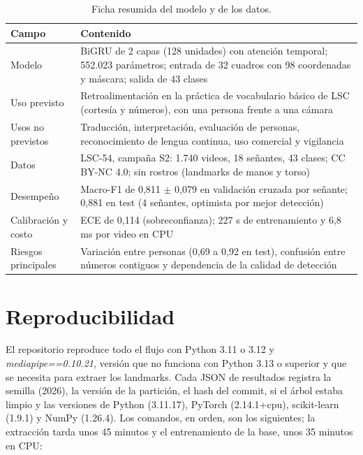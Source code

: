 \documentclass[11pt,a4paper]{article}
\newcommand{\code}[1]{\textit{#1}}
\begin{document}
\begin{table}[htbp]
\centering
\caption{Ficha resumida del modelo y de los datos.}\label{tab:ficha}
\small
\renewcommand{\arraystretch}{1.15}
\begin{tabularx}{\textwidth}{@{}>{\raggedright\arraybackslash}p{2.8cm}Y@{}}
\toprule
\textbf{Campo} & \textbf{Contenido}\\
\midrule
Modelo & BiGRU de 2 capas (128 unidades) con atención temporal; 552.023 parámetros; entrada de 32 cuadros con 98 coordenadas y máscara; salida de 43 clases\\
Uso previsto & Retroalimentación en la práctica de vocabulario básico de LSC (cortesía y números), con una persona frente a una cámara\\
Usos no previstos & Traducción, interpretación, evaluación de personas, reconocimiento de lengua continua, uso comercial y vigilancia\\
Datos & LSC-54, campaña S2: 1.740 videos, 18 señantes, 43 clases; CC BY-NC 4.0; sin rostros (landmarks de manos y torso)\\
Desempeño & Macro-F1 de 0,811 $\pm$ 0,079 en validación cruzada por señante; 0,881 en test (4 señantes, optimista por mejor detección)\\
Calibración y costo & ECE de 0,114 (sobreconfianza); 227 s de entrenamiento y 6,8 ms por video en CPU\\
Riesgos principales & Variación entre personas (0,69 a 0,92 en test), confusión entre números contiguos y dependencia de la calidad de detección\\
\bottomrule
\end{tabularx}
\end{table}

\section{Reproducibilidad}

El repositorio reproduce todo el flujo con Python 3.11 o 3.12 y \code{mediapipe==0.10.21}, versión que no funciona con Python 3.13 o superior y que se necesita para extraer los landmarks. Cada JSON de resultados registra la semilla (2026), la versión de la partición, el hash del commit, si el árbol estaba limpio y las versiones de Python (3.11.17), PyTorch (2.14.1+cpu), scikit-learn (1.9.1) y NumPy (1.26.4). Los comandos, en orden, son los siguientes; la extracción tarda unos 45 minutos y el entrenamiento de la base, unos 35 minutos en CPU:
\end{document}
